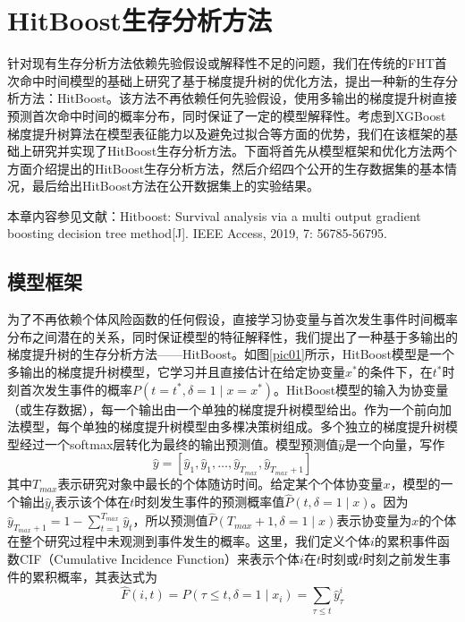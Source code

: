 
\chapter{HitBoost生存分析方法}

针对现有生存分析方法依赖先验假设或解释性不足的问题，我们在传统的FHT首次命中时间模型的基础上研究了基于梯度提升树的优化方法，提出一种新的生存分析方法：HitBoost。该方法不再依赖任何先验假设，使用多输出的梯度提升树直接预测首次命中时间的概率分布，同时保证了一定的模型解释性。考虑到XGBoost梯度提升树算法在模型表征能力以及避免过拟合等方面的优势，我们在该框架的基础上研究并实现了HitBoost生存分析方法。下面将首先从模型框架和优化方法两个方面介绍提出的HitBoost生存分析方法，然后介绍四个公开的生存数据集的基本情况，最后给出HitBoost方法在公开数据集上的实验结果。

本章内容参见文献：Hitboost: Survival analysis via a multi­ output gradient boosting decision tree method[J]. IEEE Access, 2019, 7: 56785-­56795.

\section{模型框架}

为了不再依赖个体风险函数的任何假设，直接学习协变量与首次发生事件时间概率分布之间潜在的关系，同时保证模型的特征解释性，我们提出了一种基于多输出的梯度提升树的生存分析方法——HitBoost。如图\ref{pic01}所示，HitBoost模型是一个多输出的梯度提升树模型，它学习并且直接估计在给定协变量$x^*$的条件下，在$t^*$时刻首次发生事件的概率$P(t = t^*,\delta = 1\mid x = x^* )$。HitBoost模型的输入为协变量（或生存数据），每一个输出由一个单独的梯度提升树模型给出。作为一个前向加法模型，每个单独的梯度提升树模型由多棵决策树组成。多个独立的梯度提升树模型经过一个softmax层转化为最终的输出预测值。模型预测值$\hat{y}$是一个向量，写作
\begin{equation}
\hat{y}=\left[\hat{y}_1, \hat{y}_1, \dots, \hat{y}_{T_{max}}, \hat{y}_{T_{max}+1}\right] \label{F31}
\end{equation}
其中$T_{max}$表示研究对象中最长的个体随访时间。给定某个个体协变量$x$，模型的一个输出$\hat{y}_t$表示该个体在$t$时刻发生事件的预测概率值$\hat{P}(t, \delta = 1 \mid x)$。因为$\hat{y}_{T_{max}+1}=1-\sum_{t=1}^{T_{max}} \hat{y}_t$，所以预测值$\hat{P}(T_{max}+1, \delta = 1 \mid x)$表示协变量为$x$的个体在整个研究过程中未观测到事件发生的概率。这里，我们定义个体$i$的累积事件函数CIF（Cumulative Incidence Function）来表示个体$i$在$t$时刻或$t$时刻之前发生事件的累积概率，其表达式为
\begin{equation}
\hat{F}(i, t) = P(\tau \le t, \delta = 1 \mid x_i) = \sum_{\tau \le t} \hat{y}_{\tau}^i \label{F32}
\end{equation}

